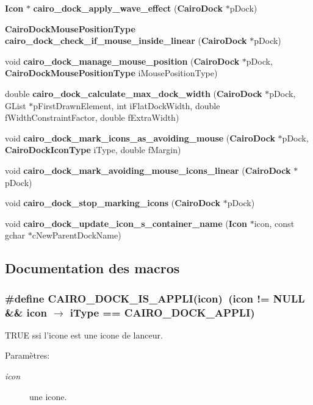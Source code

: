 \begin{CompactItemize}
\item 
{\bf Icon} $\ast$ {\bf cairo\_\-dock\_\-apply\_\-wave\_\-effect} ({\bf CairoDock} $\ast$pDock)
\item 
{\bf CairoDockMousePositionType} {\bf cairo\_\-dock\_\-check\_\-if\_\-mouse\_\-inside\_\-linear} ({\bf CairoDock} $\ast$pDock)
\item 
void {\bf cairo\_\-dock\_\-manage\_\-mouse\_\-position} ({\bf CairoDock} $\ast$pDock, {\bf CairoDockMousePositionType} iMousePositionType)
\item 
double {\bf cairo\_\-dock\_\-calculate\_\-max\_\-dock\_\-width} ({\bf CairoDock} $\ast$pDock, GList $\ast$pFirstDrawnElement, int iFlatDockWidth, double fWidthConstraintFactor, double fExtraWidth)
\item 
void {\bf cairo\_\-dock\_\-mark\_\-icons\_\-as\_\-avoiding\_\-mouse} ({\bf CairoDock} $\ast$pDock, {\bf CairoDockIconType} iType, double fMargin)
\item 
void {\bf cairo\_\-dock\_\-mark\_\-avoiding\_\-mouse\_\-icons\_\-linear} ({\bf CairoDock} $\ast$pDock)
\item 
void {\bf cairo\_\-dock\_\-stop\_\-marking\_\-icons} ({\bf CairoDock} $\ast$pDock)
\item 
void {\bf cairo\_\-dock\_\-update\_\-icon\_\-s\_\-container\_\-name} ({\bf Icon} $\ast$icon, const gchar $\ast$cNewParentDockName)
\end{CompactItemize}


\subsection{Documentation des macros}
\subsubsection{\setlength{\rightskip}{0pt plus 5cm}\#define CAIRO\_\-DOCK\_\-IS\_\-APPLI(icon)~(icon != NULL \&\& icon $\rightarrow$ iType == CAIRO\_\-DOCK\_\-APPLI)}\label{cairo-dock-icons_8h_761b6ff927a501c49e5c26849094a141}


TRUE ssi l'icone est une icone de lanceur. \begin{Desc}
\item[Paramètres:]
\begin{description}
\item[{\em icon}]une icone. \end{description}
\end{Desc}

